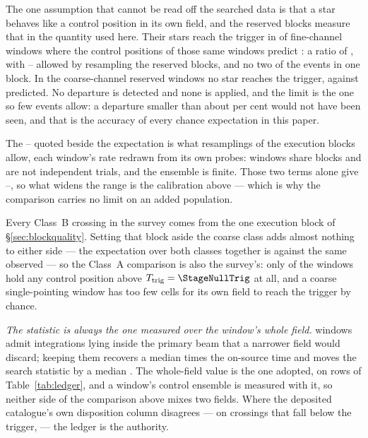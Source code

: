 The one assumption that cannot be read off the searched data is that a star
behaves like a control position in its own field, and the reserved blocks
measure that in the quantity used here. Their stars reach the trigger in
\StHoObs{} of \StHoNFine{} fine-channel windows where the control positions
of those same windows predict \StHoExpFine: a ratio of \StHoRatio, with
\StHoLo--\StHoHi{} allowed by resampling the reserved blocks, and no two of
the events in one block. In the \StHoNCoarse{} coarse-channel reserved
windows no star reaches the trigger, against \StHoExpCoarse{} predicted. No
departure is detected and none is applied, and the limit is the one so few
events allow: a departure smaller than about \StHoAccPct{} per cent would not
have been seen, and that is the accuracy of every chance expectation in this
paper.

The \CeLo--\CeHi{} quoted beside the expectation is what \CeNBoot{}
resamplings of the execution blocks allow, each window's rate redrawn from its
own \NCtrl{} probes: windows share blocks and are not independent trials, and
the ensemble is finite. Those two terms alone give \CeLoNull--\CeHiNull, so
what widens the range is the calibration above --- which is why the comparison
carries no limit on an added population.

Every Class~B crossing in the survey comes from the one execution block of
\S\ref{sec:blockquality}. Setting that block aside the coarse class adds
almost nothing to either side --- the expectation over both classes together
is \CeExpSurv{} against the same \CeObs{} observed --- so the Class~A
comparison is also the survey's: only \NCtrlWinObs{} of the \NWindows{}
windows hold any control position above $T_{\rm trig}=\StageNullTrig$ at all,
and a coarse single-pointing window has too few cells for its own field to
reach the trigger by chance.

\emph{The statistic is always the one measured over the window's whole field.}
\StNRep{} windows admit integrations lying inside the primary beam that a
narrower field would discard; keeping them recovers a median \StRepOnsrc{}
times the on-source time and moves the search statistic by a median
\StRepDT. The whole-field value is the one adopted, on \StRepAdopted{} rows
of Table~\ref{tab:ledger}, and a window's control ensemble is measured with
it, so neither side of the comparison above mixes two fields. Where the
deposited catalogue's own disposition column disagrees --- on \StRepFell{}
crossings that fall below the trigger, \StRepAttrClause{} --- the ledger is
the authority.

